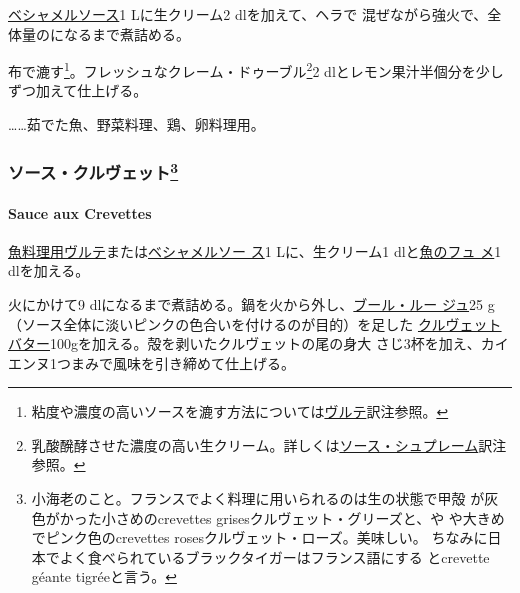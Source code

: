 \begin{recette}

\protect\hyperlink{sauce-bechamel}{ベシャメルソース}1 Lに生クリーム2
dlを加えて、ヘラで
混ぜながら強火で、全体量の\troisquarts{}になるまで煮詰める。

布で漉す\footnote{粘度や濃度の高いソースを漉す方法については\protect\hyperlink{veloute}{ヴルテ}訳注参照。}。フレッシュなクレーム・ドゥーブル\footnote{乳酸醗酵させた濃度の高い生クリーム。詳しくは\protect\hyperlink{sauce-supreme}{ソース・シュプレーム}訳注参照。}2\undemi{}
dlとレモン果汁半個分を少しずつ加えて仕上げる。

\ldots{}\ldots{}茹でた魚、野菜料理、鶏、卵料理用。

\maeaki

\hypertarget{ux30bdux30fcux30b9ux30afux30ebux30f4ux30a7ux30c3ux30c840}{%
\subsubsection[ソース・クルヴェット]{\texorpdfstring{ソース・クルヴェット\footnote{小海老のこと。フランスでよく料理に用いられるのは生の状態で甲殻
  が灰色がかった小さめのcrevettes grisesクルヴェット・グリーズと、や
  や大きめでピンク色のcrevettes rosesクルヴェット・ローズ。美味しい。
  ちなみに日本でよく食べられているブラックタイガーはフランス語にする
  とcrevette géante tigréeと言う。}}{ソース・クルヴェット}}\label{ux30bdux30fcux30b9ux30afux30ebux30f4ux30a7ux30c3ux30c840}}

\hypertarget{sauce-aux-crevettes}{%
\paragraph{Sauce aux Crevettes}\label{sauce-aux-crevettes}}


\protect\hyperlink{veloute-de-poisson}{魚料理用ヴルテ}または\protect\hyperlink{sauce-bechamel}{ベシャメルソー
ス}1 Lに、生クリーム1\undemi{}
dlと\protect\hyperlink{fumet-de-poisson}{魚のフュ メ}1\undemi{}
dlを加える。

火にかけて9
dlになるまで煮詰める。鍋を火から外し、\protect\hyperlink{}{ブール・ルー
ジュ}25 g（ソース全体に淡いピンクの色合いを付けるのが目的）を足した
\protect\hyperlink{}{クルヴェットバター}100gを加える。殻を剥いたクルヴェットの尾の身大
さじ3杯を加え、カイエンヌ1つまみで風味を引き締めて仕上げる。


\end{recette}
